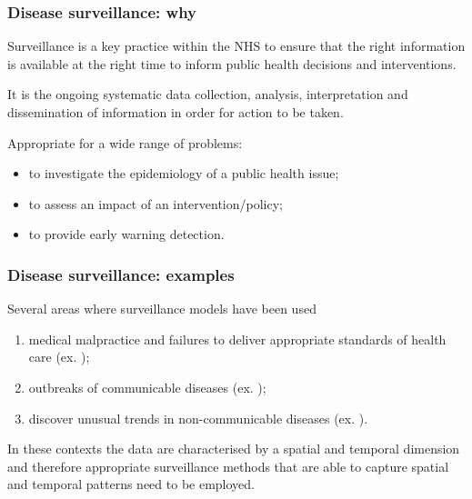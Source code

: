 \documentclass[slidestop,compress,serif,10pt]{beamer}
\begin{document}
\begin{frame}
\frametitle{Disease surveillance: why}
 \begin{block}{}
Surveillance is a key practice within the NHS to ensure that the right information is available at the right time to inform public health decisions and interventions. 

\vspace{5pt} It is the ongoing systematic data collection, analysis, interpretation and dissemination of information in order for action to be taken. 
\end{block}

\vspace{20pt} Appropriate for a wide range of problems:
\begin{itemize}
\item to investigate the epidemiology of a public health issue;
\item to assess an impact of an intervention/policy;
\item to provide early warning detection.
\end{itemize}
\end{frame}
\begin{frame}
\frametitle{Disease surveillance: examples}
Several areas where surveillance models have been used
\vfill\begin{enumerate}
\vfill\item medical malpractice and failures to deliver appropriate standards of health care (ex. \citet{Marshall:2004}); 
\vfill\item outbreaks of communicable diseases (ex. \citet{WHOsurv});
\vfill\item discover unusual trends in non-communicable diseases (ex. \citet{kxs005}).
\end{enumerate}

\vspace{20pt} \begin{block}{}
In these contexts the data are characterised by a spatial and temporal dimension and therefore appropriate surveillance methods that are able to capture \alert{spatial and temporal patterns} need to be employed. 
\end{block}
\end{frame}
\end{document}
